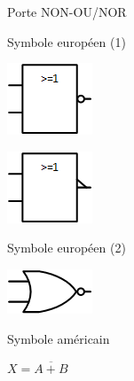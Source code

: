 \documentclass[11pt,a4paper]{article}
\begin{document}
\begin{table}[!ht]
  \centering
  \begin{minipage}{0.70\textwidth}
    \centering

    Porte NON-OU/NOR

    \medskip

    \begin{minipage}{0.50\textwidth}
      \centering

      \begin{center}
      Symbole européen (1)

      \includegraphics[scale=2.00]{img/portes_logiques/2-NOR/LogicGate-NOR_eur1.png}

      \medskip

      \includegraphics[scale=2.00]{img/portes_logiques/2-NOR/LogicGate-NOR_eur2.png}

      Symbole européen (2)
      \end{center}

    \end{minipage}
    \hfillx
    \begin{minipage}{0.50\textwidth}
      \centering

      \begin{center}

      \includegraphics[scale=2.00]{img/portes_logiques/2-NOR/LogicGate-NOR_usa.png}

      Symbole américain
      \end{center}

    \end{minipage}

  \end{minipage}
  \hfillx
  \begin{minipage}{0.30\textwidth}
    \centering

    \begin{center}
    $ X = \overline{A + B} $


\end{center}
\end{minipage}
\end{table}
\end{document}
